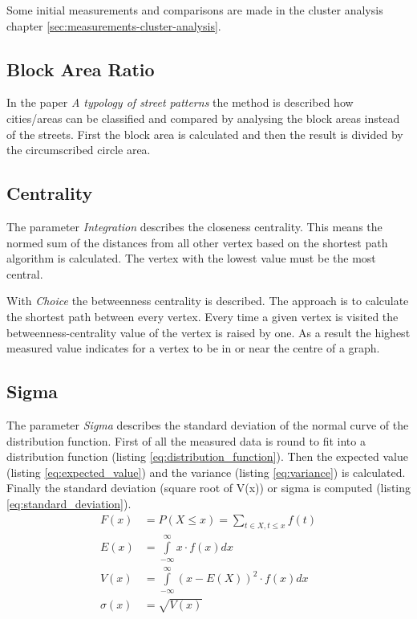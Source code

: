 Some initial measurements and comparisons are made in the cluster analysis chapter \ref{sec:measurements-cluster-analysis}.

\subsection{Block Area Ratio}
In the paper \textit{A typology of street patterns}\citep{blockArea:2014} the method is described how cities/areas can be classified and compared by analysing the block areas instead of the streets. First the block area is calculated and then the result is divided by the circumscribed circle area.

\subsection{Centrality}
The parameter \textit{Integration} describes the closeness centrality. This means the normed sum of the distances from all other vertex based on the shortest path algorithm is calculated. The vertex with the lowest value must be the most central.

With \textit{Choice} the betweenness centrality is described. The approach is to calculate the shortest path between every vertex. Every time a given vertex is visited the betweenness-centrality value of the vertex is raised by one. As a result the highest measured value indicates for a vertex to be in or near the centre of a graph.

\subsection{Sigma}
The parameter \textit{Sigma} describes the standard deviation of the normal curve of the distribution function.
First of all the measured data is round to fit into a distribution function (listing \ref{eq:distribution_function}). Then the expected value (listing \ref{eq:expected_value}) and the variance (listing \ref{eq:variance}) is calculated. Finally the standard deviation (square root of V(x)) or sigma is computed (listing \ref{eq:standard_deviation}).
\begin{align}
\label{eq:distribution_function} 
F(x) &= P(X \leq x) =  \sum_{t\in{X}, t\leq{x}}{f(t)} \\
\label{eq:expected_value} 
E(x) &= \int\limits_{-\infty}^\infty x \cdot f(x)dx \\
\label{eq:variance} 
V(x) &= \int\limits_{-\infty}^\infty (x - E(X))^2 \cdot f(x)dx \\
\label{eq:standard_deviation} 
\sigma(x) &= \sqrt{V(x)}
\end{align}

